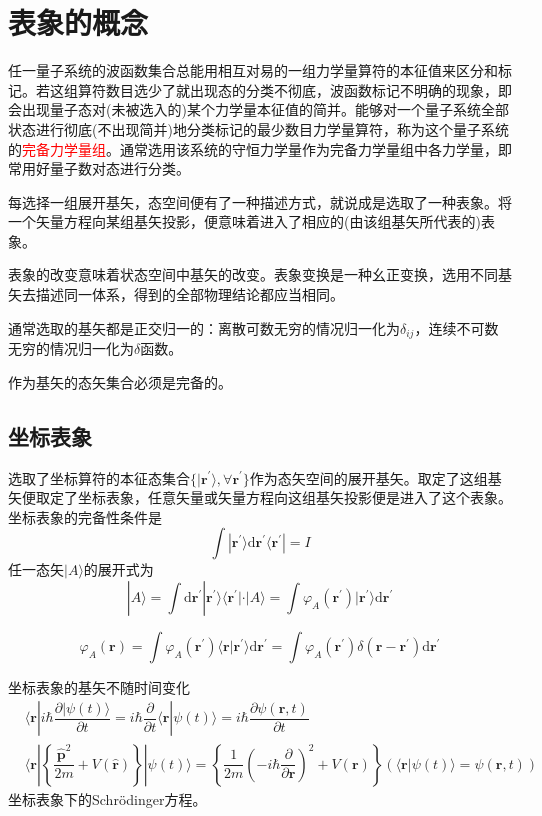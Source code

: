 \documentclass[11pt,a4paper]{article}
\renewcommand{\vec}[1]{\boldsymbol{#1}}
\newcommand{\dif}{\mathrm{d}}
\begin{document}
\section{表象的概念}
任一量子系统的波函数集合总能用相互对易的一组力学量算符的本征值来区分和标记。若这组算符数目选少了就出现态的分类不彻底，波函数标记不明确的现象，即会出现量子态对(未被选入的)某个力学量本征值的简并。能够对一个量子系统全部状态进行彻底(不出现简并)地分类标记的最少数目力学量算符，称为这个量子系统的\textcolor{red}{完备力学量组}。通常选用该系统的守恒力学量作为完备力学量组中各力学量，即常用好量子数对态进行分类。


每选择一组展开基矢，态空间便有了一种描述方式，就说成是选取了一种表象。将一个矢量方程向某组基矢投影，便意味着进入了相应的(由该组基矢所代表的)表象。

表象的改变意味着状态空间中基矢的改变。表象变换是一种幺正变换，选用不同基矢去描述同一体系，得到的全部物理结论都应当相同。

通常选取的基矢都是正交归一的：离散可数无穷的情况归一化为$\delta_{ij}$，连续不可数无穷的情况归一化为$\delta$函数。

作为基矢的态矢集合必须是完备的。

\subsection{坐标表象}
选取了坐标算符的本征态集合$\{|\vec{r}^\prime \rangle, \forall \vec{r}^\prime\}$作为态矢空间的展开基矢。取定了这组基矢便取定了坐标表象，任意矢量或矢量方程向这组基矢投影便是进入了这个表象。坐标表象的完备性条件是
\begin{equation}
\int |\vec{r}^\prime \rangle \dif \vec{r}^\prime \langle \vec{r}^\prime | = I
\end{equation}
任一态矢$|A \rangle$的展开式为
\begin{equation}
|A \rangle = \int \dif \vec{r}^\prime |\vec{r}^\prime \rangle  \langle \vec{r}^\prime | \cdot |A\rangle = \int \varphi_A(\vec{r}^\prime) |\vec{r}^\prime \rangle \dif \vec{r}^\prime
\end{equation}


\begin{equation}
\varphi_A(\vec{r}) = \int \varphi_A(\vec{r}^\prime) \langle \vec{r} | \vec{r}^\prime \rangle \dif \vec{r}^\prime =  \int \varphi_A(\vec{r}^\prime) \delta(\vec{r} -\vec{r}^\prime) \dif \vec{r}^\prime
\end{equation}



坐标表象的基矢不随时间变化
\begin{align*}
& \langle \vec{r}| i\hbar \dfrac{\partial |\psi(t) \rangle}{\partial t} = i\hbar \dfrac{\partial}{\partial t} \langle \vec{r} |\psi(t) \rangle = i\hbar \dfrac{\partial \psi(\vec{r}, t)}{\partial t} \\
& \langle \vec{r} | \left\{\dfrac{\vec{\hat{p}}^2}{2m} +V(\vec{\hat{r}}) \right\}  |\psi(t) \rangle = \left\{\dfrac{1}{2m} \left(-i\hbar \dfrac{\partial}{\partial \vec{r}} \right)^2 +V\left(\vec{r} \right) \right\} (\langle \vec{r} |\psi(t) \rangle = \psi(\vec{r}, t) )
\end{align*}
坐标表象下的Schr\"odinger方程。
\end{document}
